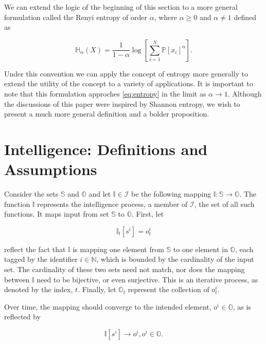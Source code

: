 \documentclass[english]{article}
\begin{document}
We can extend the logic of the beginning of this section to a more
general formulation called the Renyi entropy of order $\alpha$, where
$\alpha\geq0$ and $\alpha\neq1$ defined as

\begin{equation}
\mathbb{H_{\alpha}}(X)=\frac{1}{1-\alpha}\log\left[\sum_{i=1}^{N}\mathbb{P}\left[x_{i}\right]^{\alpha}\right].\label{eq:renyi}
\end{equation}


Under this convention we can apply the concept of entropy more generally
to extend the utility of the concept to a variety of applications.
It is important to note that this formulation approches \ref{eq:entropy}
in the limit as $\alpha\rightarrow1$. Although the discussions of
this paper were inspired by Shannon entropy, we wish to present a
much more general definition and a bolder proposition.


\section{Intelligence: Definitions and Assumptions\label{sec:Intelligence}}

Consider the sets $\mathbb{S}$ and $\mathbb{O}$ and let $\mathbb{I}\in\mathscr{I}$
be the following mapping $\mathbb{I}:\mathbb{S}\rightarrow\mathbb{O}$.
The function $\mathbb{I}$ represents the intelligence process, a
member of $\mathscr{I}$, the set of all such functions. It maps input
from set $\mathbb{S}$ to $\mathbb{O}$. First, let 

\begin{equation}
\mathbb{I}_{t}\left[s^{i}\right]=o_{t}^{i}
\end{equation}


reflect the fact that $\mathbb{I}$ is mapping one element from $\mathbb{S}$
to one element in $\mathbb{O}$, each tagged by the identifier $i\in\mathbb{N}$,
which is bounded by the cardinality of the input set. The cardinality
of these two sets need not match, nor does the mapping between $\mathbb{I}$
need to be bijective, or even surjective. This is an iterative process,
as denoted by the index, $t$. Finally, let $\mathbb{\mathbb{O}}_{t}$
represent the collection of $o_{t}^{i}$.

Over time, the mapping should converge to the intended element, $o^{i}\in\mathbb{O}$,
as is reflected by

\begin{equation}
\mathbb{I}\left[s^{i}\right]\rightarrow o^{i},o^{i}\in\mathbb{O}.
\end{equation}
\end{document}
